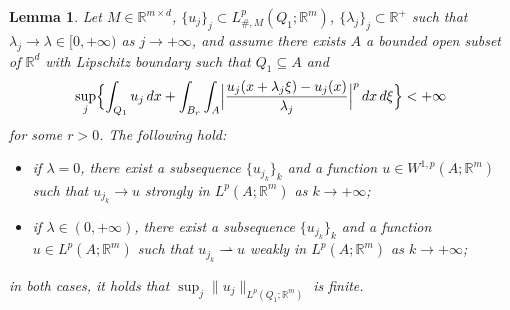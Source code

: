 \documentclass[10pt,a4paper]{amsart}
\newtheorem{lemma}{Lemma}
\newcommand{\R}{\mathbb{R}}
\begin{document}
\begin{lemma} \label{lemma : compactness}
    Let $M\in \R^{m\times d}$, $\{u_j\}_j\subset L^p_{\#,M}(Q_1;\R^m)$, $\{\lambda_j\}_j\subset \R^+$ such that $\lambda_j\to \lambda\in[0,+\infty)$ as $j\to+\infty$, and assume there exists $A$ a bounded open subset of $\R^d$ with Lipschitz boundary such that $Q_1\subseteq A$ and
    \begin{equation*}
        \sup_{j} \Bigl\{ \int_{Q_1} u_j\, dx + \int_{B_r}\int_{A}\Bigl|\frac{u_j(x+\lambda_j\xi)-u_j(x)}{\lambda_j}\Bigr|^p\, dx\, d\xi \Bigr\}<+\infty
    \end{equation*}
    for some $r>0$.
    The following hold:
    \begin{itemize}
        \item[(i)] if $\lambda=0$, there exist a subsequence $\{u_{j_k}\}_k$ and a function $u\in W^{1,p}(A;\R^m)$ such that $u_{j_k}\to u$ strongly in $L^p(A;\R^m)$ as $k\to+\infty$;
        \item[(ii)] if $\lambda\in(0,+\infty)$, there exist a subsequence $\{u_{j_k}\}_k$ and a function $u\in L^{p}(A;\R^m)$ such that $u_{j_k}\rightharpoonup u$ weakly in $L^p(A;\R^m)$ as $k\to+\infty$;
    \end{itemize}
    in both cases, it holds that $\sup_j \|u_j\|_{L^p(Q_1;\R^m)}$ is finite.
\end{lemma}
\end{document}
